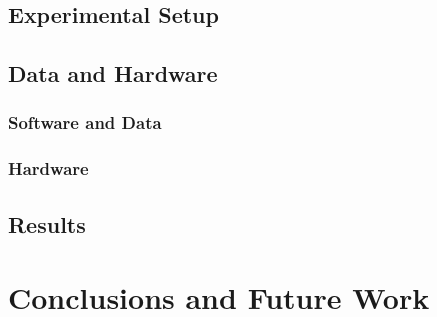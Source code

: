 \subsection{Experimental Setup}
\label{subsec:exp_setup}

\subsection{Data and Hardware}
\label{subsec:hardware}

\subsubsection{Software and Data}
\label{subsubsec:software}

\subsubsection{Hardware}
\label{subsubsec:hardware}

\subsection{Results}
\label{subsec:results}

\section{Conclusions and Future Work}
\label{sec:discussion_conclusion}


